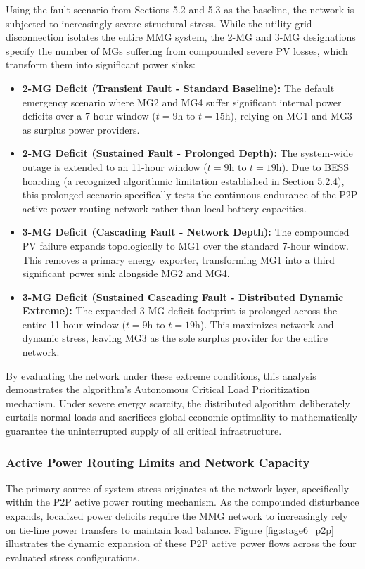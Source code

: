 Using the fault scenario from Sections 5.2 and 5.3 as the baseline, the network is subjected to increasingly severe structural stress. While the utility grid disconnection isolates the entire MMG system, the 2-MG and 3-MG designations specify the number of MGs suffering from compounded severe PV losses, which transform them into significant power sinks:
\begin{itemize}
    \item \textbf{2-MG Deficit (Transient Fault - Standard Baseline):} The default emergency scenario where MG2 and MG4 suffer significant internal power deficits over a 7-hour window ($t=9\text{h}$ to $t=15\text{h}$), relying on MG1 and MG3 as surplus power providers.
    \item \textbf{2-MG Deficit (Sustained Fault - Prolonged Depth):} The system-wide outage is extended to an 11-hour window ($t=9\text{h}$ to $t=19\text{h}$). Due to BESS hoarding (a recognized algorithmic limitation established in Section 5.2.4), this prolonged scenario specifically tests the continuous endurance of the P2P active power routing network rather than local battery capacities.
    \item \textbf{3-MG Deficit (Cascading Fault - Network Depth):} The compounded PV failure expands topologically to MG1 over the standard 7-hour window. This removes a primary energy exporter, transforming MG1 into a third significant power sink alongside MG2 and MG4.
    \item \textbf{3-MG Deficit (Sustained Cascading Fault - Distributed Dynamic Extreme):} The expanded 3-MG deficit footprint is prolonged across the entire 11-hour window ($t=9\text{h}$ to $t=19\text{h}$). This maximizes network and dynamic stress, leaving MG3 as the sole surplus provider for the entire network.
\end{itemize}

By evaluating the network under these extreme conditions, this analysis demonstrates the algorithm's Autonomous Critical Load Prioritization mechanism. Under severe energy scarcity, the distributed algorithm deliberately curtails normal loads and sacrifices global economic optimality to mathematically guarantee the uninterrupted supply of all critical infrastructure.

\subsubsection{Active Power Routing Limits and Network Capacity}

The primary source of system stress originates at the network layer, specifically within the P2P active power routing mechanism. As the compounded disturbance expands, localized power deficits require the MMG network to increasingly rely on tie-line power transfers to maintain load balance. Figure \ref{fig:stage6_p2p} illustrates the dynamic expansion of these P2P active power flows across the four evaluated stress configurations.

